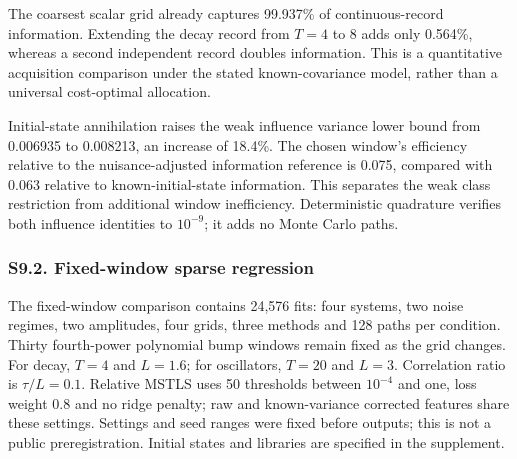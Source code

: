 \documentclass[
  american,
  11pt,
]{article}
\begin{document}
The coarsest scalar grid already captures 99.937\% of continuous-record
information. Extending the decay record from \(T=4\) to \(8\) adds only
0.564\%, whereas a second independent record doubles information. This
is a quantitative acquisition comparison under the stated
known-covariance model, rather than a universal cost-optimal allocation.

Initial-state annihilation raises the weak influence variance lower
bound from 0.006935 to 0.008213, an increase of 18.4\%. The chosen
window's efficiency relative to the nuisance-adjusted information
reference is 0.075, compared with 0.063 relative to known-initial-state
information. This separates the weak class restriction from additional
window inefficiency. Deterministic quadrature verifies both influence
identities to \(10^{-9}\); it adds no Monte Carlo paths.

\subsubsection{S9.2. Fixed-window sparse
regression}\label{s9.2.-fixed-window-sparse-regression}

The fixed-window comparison contains 24,576 fits: four systems, two
noise regimes, two amplitudes, four grids, three methods and 128 paths
per condition. Thirty fourth-power polynomial bump windows remain fixed
as the grid changes. For decay, \(T=4\) and \(L=1.6\); for oscillators,
\(T=20\) and \(L=3\). Correlation ratio is \(\tau/L=0.1\). Relative
MSTLS uses 50 thresholds between \(10^{-4}\) and one, loss weight 0.8
and no ridge penalty; raw and known-variance corrected features share
these settings. Settings and seed ranges were fixed before outputs; this
is not a public preregistration. Initial states and libraries are
specified in the supplement.
\end{document}
